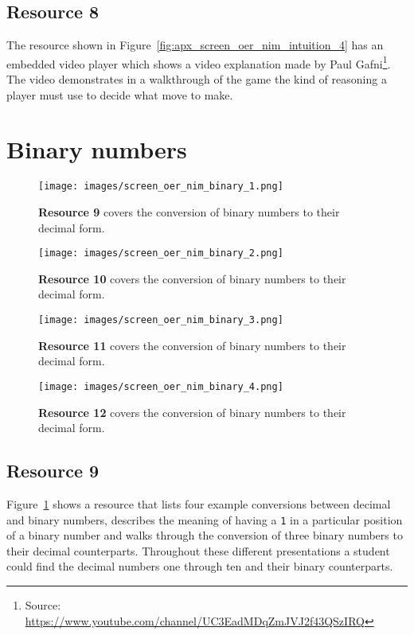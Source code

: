 \subsection{Resource 8}
The resource shown in Figure~\ref{fig:apx_screen_oer_nim_intuition_4} has an
embedded video player which shows a video explanation made by
Paul Gafni\footnote{Source:
	\url{https://www.youtube.com/channel/UC3EadMDqZmJVJ2f43QSzIRQ}}.
The video demonstrates in a walkthrough of the game the kind of reasoning a
player must use to decide what move to make.
\section{Binary numbers}
\begin{figure}[ht]
    \centering
    \texttt{[image: images/screen\_oer\_nim\_binary\_1.png]}
	\caption[Resource 9]{\textbf{Resource 9} covers the  conversion of binary numbers to
	their decimal form.}
    \label{fig:apx_screen_oer_nim_binary_1}
\end{figure}
\begin{figure}[ht]
    \centering
    \texttt{[image: images/screen\_oer\_nim\_binary\_2.png]}
	\caption[Resource 10]{\textbf{Resource 10} covers the  conversion of binary numbers to
	their decimal form.}
    \label{fig:apx_screen_oer_nim_binary_2}
\end{figure}
\begin{figure}[ht]
    \centering
    \texttt{[image: images/screen\_oer\_nim\_binary\_3.png]}
	\caption[Resource 11]{\textbf{Resource 11} covers the  conversion of binary numbers to
	their decimal form.}
    \label{fig:apx_screen_oer_nim_binary_3}
\end{figure}
\begin{figure}[ht]
    \centering
    \texttt{[image: images/screen\_oer\_nim\_binary\_4.png]}
	\caption[Resource 12]{\textbf{Resource 12} covers the  conversion of binary numbers to
	their decimal form.}
    \label{fig:apx_screen_oer_nim_binary_4}
\end{figure}
\subsection{Resource 9}
Figure~\ref{fig:apx_screen_oer_nim_binary_1} shows a resource that lists
four example
conversions between decimal and binary numbers, describes the meaning of having
a \verb|1| in a particular position of a binary number and walks through the
conversion of three binary numbers to their decimal counterparts. Throughout
these different presentations a student could find the decimal numbers one
through ten and their binary counterparts.
